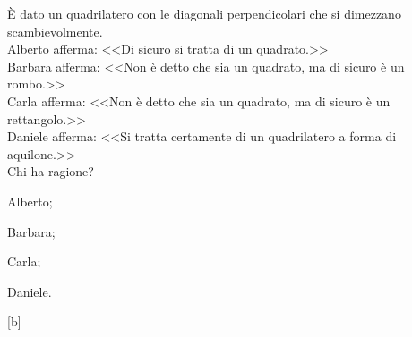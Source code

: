 \begin{esercizio}
\label{ese:4.67}
\`E dato un quadrilatero con le diagonali perpendicolari che si 
dimezzano scambievolmente.\\
Alberto afferma: <<Di sicuro si tratta di un quadrato.>>\\
Barbara afferma: <<Non è detto che sia un quadrato, ma di sicuro è un 
rombo.>>\\
Carla afferma: <<Non è detto che sia un quadrato, ma di sicuro è un 
rettangolo.>>\\
Daniele afferma: <<Si tratta certamente di un quadrilatero a forma di 
aquilone.>>\\
Chi ha ragione?
\begin{multicols}{4}
\begin{enumeratea}
\item Alberto;
\item Barbara;
\item Carla;
\item Daniele.
\end{enumeratea}
\end{multicols}
\hfill[b]
\end{esercizio}
